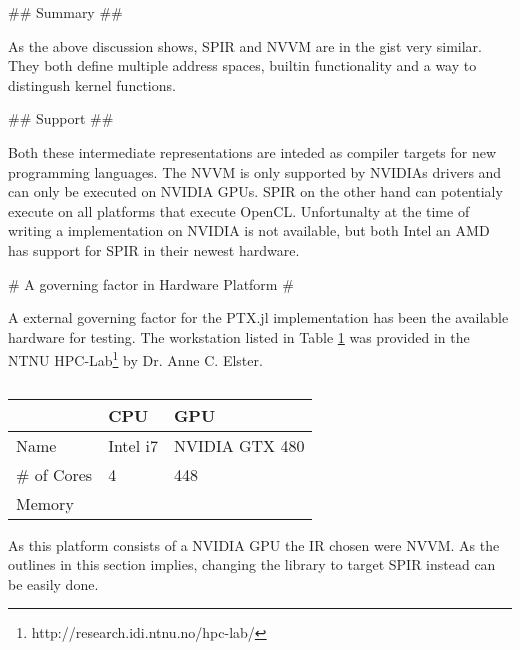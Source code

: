 \begin{markdown}
## Summary ## 

As the above discussion shows, SPIR and NVVM are in the gist very
similar. They both define multiple address spaces, builtin
functionality and a way to distingush kernel functions.

## Support ##

Both these intermediate representations are inteded as compiler
targets for new programming languages. The NVVM is only supported by
NVIDIAs drivers and can only be executed on NVIDIA GPUs. SPIR on the
other hand can potentialy execute on all platforms that execute
OpenCL. Unfortunalty at the time of writing a implementation on NVIDIA
is not available, but both Intel an AMD has support for SPIR in their
newest hardware.

# A governing factor in Hardware Platform #

A external governing factor for the PTX.jl implementation has been the
available hardware for testing. The workstation listed in Table
\ref{tab:hw} was provided in the NTNU
HPC-Lab\footnote{http://research.idi.ntnu.no/hpc-lab/} by Dr. Anne
C. Elster.


\begin{table}[H]
  \centering
  \begin{tabular}{|l|l|l|}
    \hline
    & CPU & GPU \\
    \hline
    \hline
    Name & Intel i7 & NVIDIA GTX 480 \\
    \hline
    \# of Cores & 4 & 448 \\
    \hline
    Memory &  &  \\
    \hline
  \end{tabular}
  \caption{}
  \label{tab:hw}
\end{table}

As this platform consists of a NVIDIA GPU the IR chosen were NVVM. As
the outlines in this section implies, changing the library to target
SPIR instead can be easily done.

\end{markdown}
